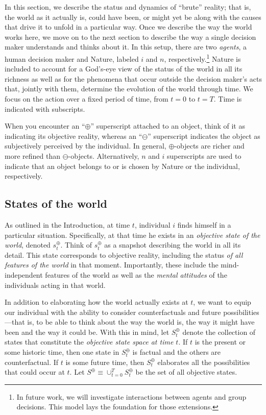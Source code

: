 \documentclass[
11pt,
titlepage,
reqno,
]{article}%
\theoremstyle{definition}
\begin{document}
In this section, we describe the status and dynamics of ``brute'' reality; that is, the world as it actually is, could have been, or might yet be along with the causes that drive it to unfold in a particular way. 
Once we describe the way the world works here, we move on to the next section to describe the way a single decision maker understands and thinks about it.
In this setup, there are two \textit{agents}, a human decision maker and Nature, labeled $i$ and $n$, respectively.\footnote
{
	In future work, we will investigate interactions between agents and group decisions.
	This model lays the foundation for those extensions.
} 
Nature is included to account for  a God's-eye view of the status of the world in all its richness as well as for the phenomena that occur outside the decision maker's acts that, jointly with them, determine the evolution of the world through time.
We focus on the action over a fixed period of time, from $t=0$ to $t=T$. 
Time is indicated with subscripts.

When you encounter an ``$\oplus$'' superscript attached to an object, think of it as indicating its objective reality, whereas an ``$\ominus$'' superscript indicates the object as subjectively perceived by the individual.
In general, $\oplus$-objects are richer and more refined than $\ominus$-objects. 
Alternatively, $n$ and $i$ superscripts are used to indicate that an object belongs to or is chosen by Nature or the individual, respectively.

 


\subsection{States of the world\label{sec:states}}

As outlined in the Introduction, at time $t$, individual $i$ finds himself in a particular situation.
Specifically, at that time he exists in an \textit{objective state of the world}, denoted $s^\oplus_t$.
Think of $s^\oplus_t$ as a snapshot describing the world in all its detail.
This state corresponds to objective reality, including the status \textit{of all features of the world} in that moment. 
Importantly, these include the  mind-independent features of the world as well as the \textit{mental attitudes} of the individuals acting in that world. 

In addition to elaborating how the world actually exists at $t$, we want to equip our individual with the ability to consider counterfactuals and future possibilities---that is, to be able to think about the way the world is, the way it might have been and the way it could be.
With this in mind, let $S^\oplus_t$ denote the collection of states that constitute the \textit{objective state space at time $t$}. 
If $t$ is the present or some historic time, then one state in  $S^\oplus_t$ is factual and the others are counterfactual. 
If $t$ is some future time, then $S^\oplus_t$ elaborates all the possibilities that could occur at $t$.
Let $S^\oplus\equiv\cup_{t=0}^T S^\oplus_t$ be the set of all objective states.
\end{document}
